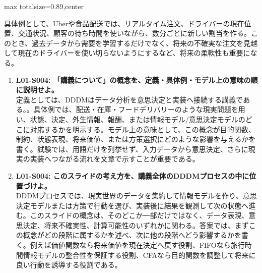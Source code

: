 \begin{minipage}[t]{0.58\textwidth}
\begin{adjustbox}{max totalsize={\textwidth}{0.89\textheight},center}
\begin{minipage}{\textwidth}
具体例として、Uberや食品配送では、リアルタイム注文、ドライバーの現在位置、交通状況、顧客の待ち時間を使いながら、数分ごとに新しい割当を作る。このとき、過去データから需要を学習するだけでなく、将来の不確実な注文を見越して現在のドライバーを使い切らないようにするなど、将来の柔軟性も重要になる。\par{}\begin{enumerate}\item \textbf{L01-S004: 「講義について」の概念を、定義・具体例・モデル上の意味の順に説明せよ。}\\定義としては、DDDMはデータ分析を意思決定と実装へ接続する講義である。。具体例では、配送・在庫・フードデリバリーのような現実問題を用い、状態、決定、外生情報、報酬、または情報モデル/意思決定モデルのどこに対応するかを明示する。モデル上の意味として、この概念が目的関数、制約、状態表現、将来価値、または方策選択にどのような影響を与えるかを書く。試験では、用語だけを列挙せず、入力データから意思決定、さらに現実の実装へつながる流れを文章で示すことが重要である。\item \textbf{L01-S004: このスライドの考え方を、講義全体のDDDMプロセスの中に位置づけよ。}\\DDDMプロセスでは、現実世界のデータを集約して情報モデルを作り、意思決定モデルまたは方策で行動を選び、実装後に結果を観測して次の状態へ進む。このスライドの概念は、そのどこか一部だけではなく、データ表現、意思決定、将来不確実性、計算可能性のいずれかに関わる。答案では、まずこの概念がどの段階に属するかを述べ、次に他の段階へどう影響するかを書く。例えば価値関数なら将来価値を現在決定へ戻す役割、FIFOなら旅行時間情報モデルの整合性を保証する役割、CFAなら目的関数を調整して将来に良い行動を誘導する役割である。\end{enumerate}
\end{minipage}
\end{adjustbox}
\end{minipage}


